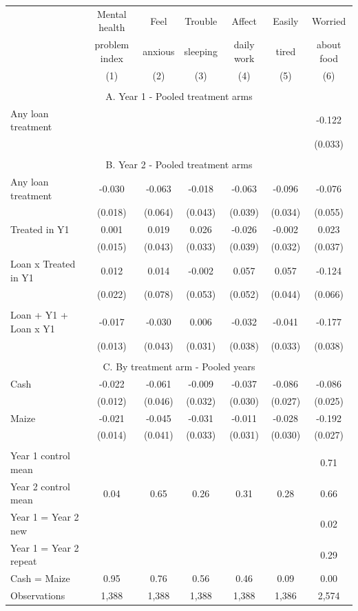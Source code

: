 \begin{tabular}{l cc cc cc}
\hline
 & Mental health & Feel & Trouble  & Affect & Easily & Worried \\ 
 & problem index & anxious & sleeping & daily work & tired & about food \\ 
 & (1) & (2) & (3) & (4) & (5) & (6)  \\ 
\hline
 \\ 
\multicolumn{7}{c}{A. Year 1 - Pooled treatment arms} \\ 
Any loan treatment & & & & &  & -0.122 \\
 & & & & &  & (0.033) \\
 \\ 
\multicolumn{7}{c}{B. Year 2 - Pooled treatment arms} \\ 
Any loan treatment & -0.030 & -0.063 & -0.018 & -0.063 & -0.096 & -0.076 \\
 & (0.018) & (0.064) & (0.043) & (0.039) & (0.034) & (0.055) \\
Treated in Y1 & 0.001 & 0.019 & 0.026 & -0.026 & -0.002 & 0.023 \\
 & (0.015) & (0.043) & (0.033) & (0.039) & (0.032) & (0.037) \\
Loan x Treated in Y1 & 0.012 & 0.014 & -0.002 & 0.057 & 0.057 & -0.124 \\
 & (0.022) & (0.078) & (0.053) & (0.052) & (0.044) & (0.066) \\
 \\ 
Loan + Y1 + Loan x Y1 & -0.017 & -0.030 & 0.006 & -0.032 & -0.041 & -0.177 \\
 & (0.013) & (0.043) & (0.031) & (0.038) & (0.033) & (0.038) \\
 \\ 
\multicolumn{7}{c}{C. By treatment arm - Pooled years} \\ 
Cash & -0.022 & -0.061 & -0.009 & -0.037 & -0.086 & -0.086 \\
 & (0.012) & (0.046) & (0.032) & (0.030) & (0.027) & (0.025) \\
Maize & -0.021 & -0.045 & -0.031 & -0.011 & -0.028 & -0.192 \\
 & (0.014) & (0.041) & (0.033) & (0.031) & (0.030) & (0.027) \\
 \\ 
\hline
Year 1 control mean &  &  &  &  &  & 0.71 \\
Year 2 control mean & 0.04 & 0.65 & 0.26 & 0.31 & 0.28 & 0.66 \\
Year 1 = Year 2 new  & & & & & & 0.02 \\
Year 1 = Year 2 repeat & & & & & & 0.29 \\
Cash = Maize & 0.95 & 0.76 & 0.56 & 0.46 & 0.09 & 0.00 \\
Observations &     1,388 &     1,388 &     1,388 &     1,388 &     1,386 &     2,574 \\
\hline
\end{tabular}
